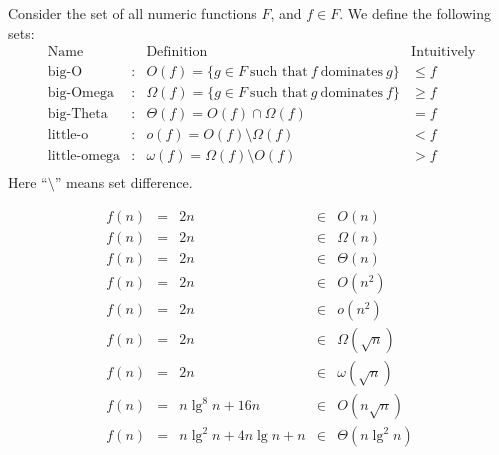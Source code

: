 \begin{flex}

  \begin{definition}
Consider the set of all numeric functions $F$, and $f \in F$.   We define the following sets:
\[
\begin{array}{lclc}
~\mbox{Name} &   & \mbox{Definition}  & \mbox{Intuitively}\\ \hline
~\mbox{big-O} & : & O(f)  = \{g \in F ~\mbox{such that}~
                    f~\mbox{dominates}~g\} & \leq f \\
~\mbox{big-Omega} & : & \Omega(f) = \{g \in F ~\mbox{such that}~ g
                        ~\mbox{dominates}~f\} & \geq f \\
~\mbox{big-Theta} & : & \Theta(f) =  O(f) \cap \Omega(f) & = f\\
~\mbox{little-o} & : & o(f) =  O(f) \setminus \Omega(f) & < f \\
~\mbox{little-omega} & : & \omega(f) =  \Omega(f) \setminus O(f) & > f\\
\end{array}
\]
Here ``$\setminus$'' means set difference.
\end{definition}

\begin{example}
\[
\begin{array}{lclcl}
f(n) & = & 2n & \in & O(n) \\
f(n) & = & 2n & \in & \Omega(n) \\
f(n) & = & 2n & \in &  \Theta(n) \\
f(n) & = & 2n & \in & O(n^2) \\
f(n) & = & 2n & \in & o(n^2) \\ 
f(n) & = & 2n & \in & \Omega(\sqrt{n}) \\
f(n) & = & 2n & \in & \omega(\sqrt{n}) \\
f(n) & = & n\lg^8{n} + 16n & \in & O(n\sqrt{n}) \\
f(n) & = & n\lg^2{n} + 4n\lg{n} + n & \in & \Theta(n \lg^2 n) \\
\end{array}
\]
\end{example}

\end{flex}

